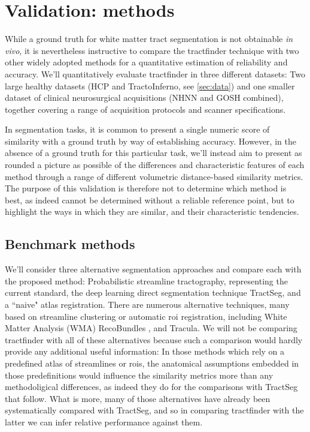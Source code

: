 
\section{Validation: methods}

While a ground truth for white matter tract segmentation is not obtainable \textit{in vivo}, it is nevertheless instructive to compare the tractfinder technique with two other widely adopted methods for a quantitative estimation of reliability and accuracy.
We'll quantitatively evaluate tractfinder in three different datasets: Two large healthy datasets (HCP and TractoInferno, see \ref{sec:data}) and one smaller dataset of clinical neurosurgical acquisitions (NHNN and GOSH combined), together covering a range of acquisition protocols and scanner specifications.

In segmentation tasks, it is common to present a single numeric score of similarity with a ground truth by way of establishing accuracy.
However, in the absence of a ground truth for this particular task, we'll instead aim to present as rounded a picture as possible of the differences and characteristic features of each method through a range of different volumetric distance-based similarity metrics.
The purpose of this validation is therefore not to determine which method is best, as indeed cannot be determined without a reliable reference point, but to highlight the ways in which they are similar, and their characteristic tendencies.

\subsection{Benchmark methods}

We'll consider three alternative segmentation approaches and compare each with the proposed method: Probabilistic streamline tractography, representing the current standard, the deep learning direct segmentation technique TractSeg, and a ``naive" atlas registration.
There are numerous alternative techniques, many based on streamline clustering or automatic \gls{roi} registration, including White Matter Analysis (WMA)\autocite{ODonnell2017} RecoBundles \autocite{Garyfallidis2018}, and Tracula.\autocite{Yendiki2011}
We will not be comparing tractfinder with all of these alternatives because such a comparison would hardly provide any additional useful information:
In those methods which rely on a predefined atlas of streamlines or \glspl{roi}, the anatomical assumptions embedded in those predefinitions would influence the similarity metrics more than any methodoligical differences, as indeed they do for the comparisons with TractSeg that follow.
What is more, many of those alternatives have already been systematically compared with TractSeg\autocite{Wasserthal2018}, and so in comparing tractfinder with the latter we can infer relative performance against them.


